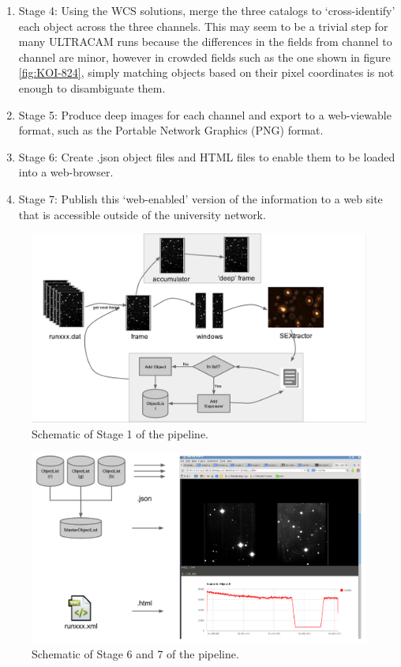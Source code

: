 \begin{enumerate}
	\item Stage 4: Using the WCS solutions, merge the three catalogs to `cross-identify' each object across the three channels. This may seem to be a trivial step for many ULTRACAM runs because the differences in the fields from channel to channel are minor, however in crowded fields such as the one shown in figure \ref{fig:KOI-824}, simply matching objects based on their pixel coordinates is not enough to disambiguate them.
	\item Stage 5: Produce deep images for each channel and export to a web-viewable format, such as the Portable Network Graphics (PNG) format. 
	\item Stage 6: Create .json object files and HTML files to enable them to be loaded into a web-browser.
	\item Stage 7: Publish this `web-enabled' version of the information to a web site that is accessible outside of the university network.  
		
\end{enumerate}

\begin{figure}[!h]
	\centering
	\includegraphics[width=130mm]{images/flowchart.png}
	\caption{Schematic of Stage 1 of the pipeline.}
	\label{flowchart}
\end{figure}


\begin{figure}[!h]
	\centering
	\includegraphics[width=130mm]{images/webpublish.png}
	\caption{Schematic of Stage 6 and 7 of the pipeline.}
	\label{webpublish}
\end{figure}

